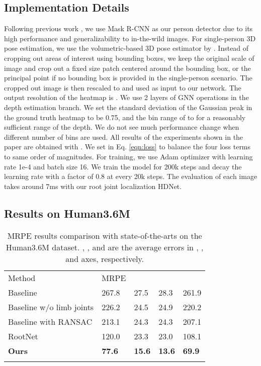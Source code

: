 \documentclass[runningheads]{llncs}
\begin{document}
\subsection{Implementation Details}
\label{sec:implementation_details}
Following previous work \cite{Moon_2019_ICCV_3DMPPE}, we use Mask R-CNN \cite{he2017mask} as our person detector due to its high performance and generalizability to in-the-wild images.
For single-person 3D pose estimation, we use the volumetric-based 3D pose estimator by \cite{sun2018integral}.
Instead of cropping out areas of interest using bounding boxes, we keep the original scale of image and crop out a fixed size patch centered around the bounding box, or the principal point if no bounding box is provided in the single-person scenario. The cropped out image is then rescaled to  and used as input to our network. The output resolution of the heatmap is .
We use 2 layers of GNN operations in the depth estimation branch.
We set the standard deviation of the Gaussian peak in the ground truth heatmap to be 0.75, and 
the bin range of  to  for a reasonably sufficient range of the depth.
We do not see much performance change when different number of bins  are used. All results of the experiments shown in the paper are obtained with .
We set  in Eq. \ref{eqn:loss} to balance the four loss terms to same order of magnitudes.
For training, we use Adam optimizer \cite{kingma2014adam} with learning rate 1e-4 and batch size 16. We train the model for 200k steps and decay the learning rate with a factor of 0.8 at every 20k steps.
The evaluation of each image takes around 7ms with our root joint localization HDNet.


\subsection{Results on Human3.6M}

\setlength{\tabcolsep}{4pt}
\begin{table}[t]
\begin{center}
\caption{MRPE results comparison with state-of-the-arts on the Human3.6M dataset. , , and  are the average errors in , , and  axes, respectively.}
\label{table:mrpe_h36m}
\begin{tabular}{l|llll}
\hline\noalign{\smallskip}
Method & MRPE &  &  & \\
\noalign{\smallskip}
\hline
\noalign{\smallskip}
Baseline & 267.8 & 27.5 & 28.3 & 261.9\\
Baseline w/o limb joints & 226.2 & 24.5 & 24.9 & 220.2\\
Baseline with RANSAC & 213.1 & 24.3 & 24.3 & 207.1\\
RootNet \cite{Moon_2019_ICCV_3DMPPE} & 120.0 & 23.3 & 23.0 & 108.1\\
\noalign{\smallskip}
\hline
\noalign{\smallskip}
\textbf{Ours} & \textbf{77.6} & \textbf{15.6} & \textbf{13.6} & \textbf{69.9}\\
\noalign{\smallskip}
\hline
\end{tabular}
\end{center}
\end{table}
\setlength{\tabcolsep}{1.4pt}
\end{document}

